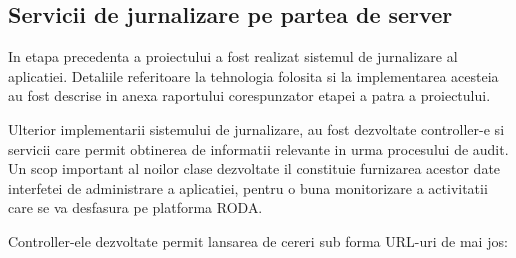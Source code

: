\subsection{Servicii de jurnalizare pe partea de server}

In etapa precedenta a proiectului a fost realizat sistemul de jurnalizare al aplicatiei. Detaliile referitoare la tehnologia folosita si la implementarea acesteia au fost descrise in anexa raportului corespunzator etapei a patra a proiectului.

Ulterior implementarii sistemului de jurnalizare, au fost dezvoltate controller-e si servicii care permit obtinerea de informatii relevante in urma procesului de audit. Un scop important al noilor clase dezvoltate il constituie furnizarea acestor date interfetei de administrare a aplicatiei, pentru o buna monitorizare a activitatii care se va desfasura pe platforma RODA.

Controller-ele dezvoltate permit lansarea de cereri sub forma URL-uri de mai jos:


